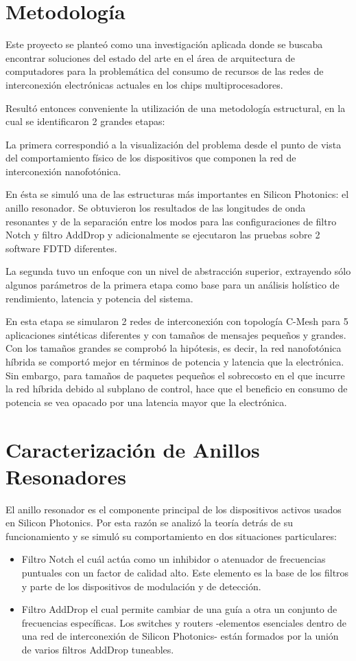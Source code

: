 \documentclass{IEEEtran}
\begin{document}
\section{Metodología}
Este proyecto se planteó como una investigación aplicada donde se buscaba 
encontrar soluciones del estado del arte en el área de arquitectura de 
computadores para la problemática del consumo de recursos de las redes de 
interconexión electrónicas actuales en los chips multiprocesadores. 

Resultó entonces conveniente la utilización de una metodología estructural, 
en la cual se identificaron 2 grandes etapas: 

La primera correspondió
a la visualización del problema desde el punto de vista del comportamiento físico de
los dispositivos que componen la red de interconexión nanofotónica. 

En ésta se simuló
una de las estructuras más importantes en Silicon Photonics: el anillo resonador. Se 
obtuvieron los resultados de las longitudes de onda resonantes y de la separación
entre los modos para las configuraciones de filtro Notch y filtro AddDrop y adicionalmente
se ejecutaron las pruebas sobre 2 software FDTD diferentes.


La segunda tuvo un enfoque con un nivel de abstracción superior, extrayendo
sólo algunos parámetros de la primera etapa como base para un análisis holístico de rendimiento,
latencia y potencia del sistema.

En esta etapa se simularon 2 redes de interconexión con topología C-Mesh para 5 aplicaciones
sintéticas diferentes y con tamaños de mensajes pequeños y grandes. Con los tamaños grandes
se comprobó la hipótesis, es decir, la red nanofotónica híbrida se comportó mejor en
términos de potencia y latencia que la electrónica. Sin embargo, para tamaños de paquetes
pequeños el sobrecosto en el que incurre la red híbrida debido al subplano de control,
hace que el beneficio en consumo de potencia se vea opacado por una latencia mayor
que la electrónica.

\section{Caracterización de Anillos Resonadores}
El anillo resonador es el componente principal 
de los dispositivos activos usados en Silicon Photonics. 
Por esta razón se analizó la teoría detrás de su funcionamiento 
y se simuló su comportamiento en dos situaciones particulares:

\begin{itemize}
\item Filtro Notch el cuál actúa como un inhibidor o atenuador de 
frecuencias puntuales con un factor de calidad alto. 
Este elemento es la base de los filtros y parte de los dispositivos de modulación y
de detección.

\item Filtro AddDrop el cual permite cambiar de una guía a otra un conjunto de 
frecuencias específicas. Los switches y routers 
-elementos esenciales dentro de una red de interconexión de Silicon Photonics- 
están formados por la unión de varios filtros AddDrop tuneables.
\end{itemize}
\end{document}
